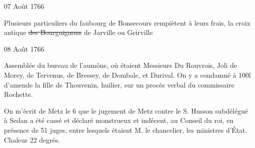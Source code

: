                      \begin{diary}{07 Août 1766}{}

                         Plusieurs particuliers du faubourg de Bonsecours
                           rempiètent à leurs frais, la croix antique
                           \sout{des Bourguignons} de Jarville ou Geirville
                        \bigskip


                     \end{diary}

                     \begin{diary}{08 Août 1766}{}

                         Assemblée du bureau de l'aumône, où étaient
                           Messieurs
                           Du Rouvrois, Joli de Morey, de
                              Tervenus, de
                              Bressey, de
                              Dombale, et Durival. On
                           y a
                           condamné à 100l d'amende la
                              fille de Thouvenin,
                           huilier, sur un procès verbal du commissaire Rochette. \bigskip


                         On m'écrit de Metz
                           le 6 que le jugement
                           de Metz contre le S. Husson
                           subdélégué à Sedan a
                           été cassé et déclaré monstrueux et indécent,
                           au Conseil du roi, en
                           présence de 51 juges,
                           entre lesquels étaient M.
                              le chancelier, les
                           ministres d’État. Chaleur 22 degrés.
                        \bigskip


                     \end{diary}

